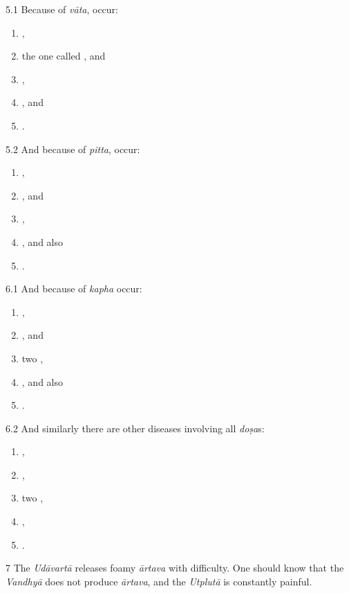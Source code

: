 \begin{translation}
\item [5.1] Because of \emph{vāta}, occur:
	\begin{enumerate}
		\item {},
		\item the one called , and
		\item {},
		\item {}, and
		\item {}.
	\end{enumerate}
\item [5.2] And because of \emph{pitta}, occur:
	\begin{enumerate}
		\item {},
		\item {}, and
		\item {},
		\item {}, and also
		\item {}.
	\end{enumerate}


\item [6.1] And because of \emph{kapha} occur:
	\begin{enumerate}
		\item {},
		\item {}, and
		\item two ,
		\item {}, and also
		\item {}.
	\end{enumerate}

\item [6.2] And similarly there are other diseases involving all \emph{doṣa}s:
	\begin{enumerate}
		\item {},
		\item {},
		\item two ,
		\item {},
		\item {}.
	\end{enumerate}

\item [7] The \emph{Udāvartā} releases foamy \emph{ārtava} with difficulty. 
One should know that the \emph{Vandhyā} does not produce \emph{ārtava}, and the \emph{Utplutā} is constantly painful. 


\end{translation}
